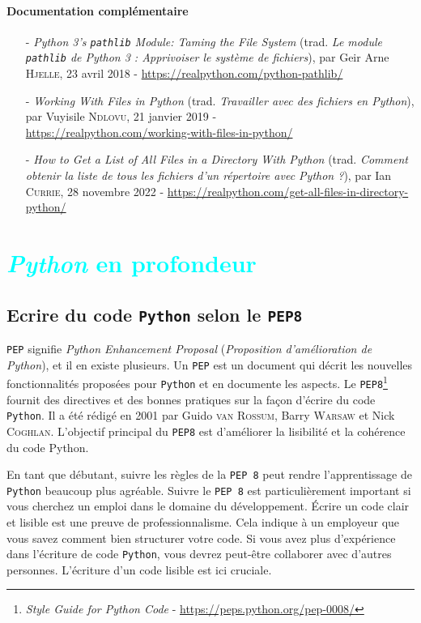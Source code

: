\documentclass[a4paper,11pt]{book}
\begin{document}
\subsection*{Documentation complémentaire}
\begin{itemize}
	\item[-] \textit{Python 3's \texttt{pathlib} Module: Taming the File System} (trad. \textit{Le module \texttt{pathlib} de Python 3 : Apprivoiser le système de fichiers}), par Geir Arne \textsc{Hjelle}, 23 avril 2018 - \url{https://realpython.com/python-pathlib/}
	\item[-] \textit{Working With Files in Python} (trad. \textit{Travailler avec des fichiers en Python}), par Vuyisile \textsc{Ndlovu}, 21 janvier 2019 - \\ \url{https://realpython.com/working-with-files-in-python/}
	\item[-] \textit{How to Get a List of All Files in a Directory With Python} (trad. \textit{Comment obtenir la liste de tous les fichiers d'un répertoire avec Python ?}), par Ian \textsc{Currie}, 28 novembre 2022 - \url{https://realpython.com/get-all-files-in-directory-python/}
\end{itemize}


\part{\textcolor{cyan}{\textit{Python} en profondeur}}

\chapter{Ecrire du code \texttt{Python} selon le \texttt{PEP8}}
\texttt{PEP} signifie \textit{Python Enhancement Proposal} (\textit{Proposition d'amélioration de Python}), et il en existe plusieurs. Un \texttt{PEP} est un document qui décrit les nouvelles fonctionnalités proposées pour \texttt{Python} et en documente les aspects. Le \texttt{PEP8}\footnote{\textit{Style Guide for Python Code} - \url{https://peps.python.org/pep-0008/}} fournit des directives et des bonnes pratiques sur la façon d'écrire du code \texttt{Python}. Il a été rédigé en 2001 par Guido \textsc{van Rossum}, Barry \textsc{Warsaw} et Nick \textsc{Coghlan}. L'objectif principal du \texttt{PEP8} est d'améliorer la lisibilité et la cohérence du code Python.
\medskip

En tant que débutant, suivre les règles de la \texttt{PEP 8} peut rendre l'apprentissage de \texttt{Python} beaucoup plus agréable. Suivre le \texttt{PEP 8} est particulièrement important si vous cherchez un emploi dans le domaine du développement. Écrire un code clair et lisible est une preuve de professionnalisme. Cela indique à un employeur que vous savez comment bien structurer votre code. Si vous avez plus d'expérience dans l'écriture de code \texttt{Python}, vous devrez peut-être collaborer avec d'autres personnes. L'écriture d'un code lisible est ici cruciale. 
\end{document}
